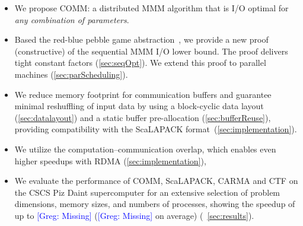 \documentclass[sigplan,review,anonymous,10pt]{acmart}\settopmatter{printfolios=true,printccs=false,printacmref=false}
\newcommand\greg[1]{\textcolor{blue}{[Greg: #1]}}
\newcommand\mac[1]{\textcolor{red}{[Mac: #1]}}
\begin{document}
\begin{itemize}[leftmargin=1em]
%
\item We propose COMM: a distributed MMM algorithm that is I/O optimal for 
\emph{any combination of parameters}. 
%
%
\item Based the red-blue pebble game 
abstraction~\cite{redblue}, we provide a new proof (constructive) of
the sequential MMM I/O lower bound.  The proof delivers tight
constant factors (\cref{sec:seqOpt}). We extend this proof to parallel machines 
(\cref{sec:parScheduling}).
%
%
\item We reduce memory footprint for communication buffers and guarantee
minimal reshuffling of input data by using a block-cyclic data layout
(\cref{sec:datalayout}) and a static buffer pre-allocation
(\cref{sec:bufferReuse}), providing compatibility with the
ScaLAPACK format~(\cref{sec:implementation}).
%
\item We utilize the computation--communication overlap, which enables
even higher speedups with RDMA (\cref{sec:implementation}),
%
\item We evaluate the performance of COMM, ScaLAPACK, CARMA and CTF on the CSCS 
Piz 
Daint supercomputer for an
extensive selection of problem dimensions, memory sizes, and numbers of
processes, showing the speedup of up to \greg{Missing} (\greg{Missing} on 
average) 
(~\cref{sec:results}).
%
\end{itemize}

%
\end{document}
